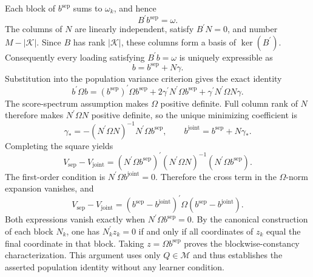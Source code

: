 Each block of \(b^{\mathrm{sep}}\) sums to \(\omega_k\), and hence
\[
B^{\prime}b^{\mathrm{sep}}=\omega.
\]
The columns of \(N\) are linearly independent, satisfy \(B^{\prime}N=0\), and number \(M-|\mathcal K|\). Since \(B\) has rank \(|\mathcal K|\), these columns form a basis of \(\ker(B^{\prime})\). Consequently every loading satisfying \(B^{\prime}b=\omega\) is uniquely expressible as
\[
b=b^{\mathrm{sep}}+N\gamma.
\]
Substitution into the population variance criterion gives the exact identity
\[
b^{\prime}\Omega b
=(b^{\mathrm{sep}})^{\prime}\Omega b^{\mathrm{sep}}
+2\gamma^{\prime}N^{\prime}\Omega b^{\mathrm{sep}}
+\gamma^{\prime}N^{\prime}\Omega N\gamma.
\]
The score-spectrum assumption makes \(\Omega\) positive definite. Full column rank of \(N\) therefore makes \(N^{\prime}\Omega N\) positive definite, so the unique minimizing coefficient is
\[
\gamma_*=-(N^{\prime}\Omega N)^{-1}N^{\prime}\Omega b^{\mathrm{sep}},
\qquad
b^{\mathrm{joint}}=b^{\mathrm{sep}}+N\gamma_*.
\]
Completing the square yields
\[
V_{\mathrm{sep}}-V_{\mathrm{joint}}
=(N^{\prime}\Omega b^{\mathrm{sep}})^{\prime}
(N^{\prime}\Omega N)^{-1}
(N^{\prime}\Omega b^{\mathrm{sep}}).
\]
The first-order condition is \(N^{\prime}\Omega b^{\mathrm{joint}}=0\). Therefore the cross term in the \(\Omega\)-norm expansion vanishes, and
\[
V_{\mathrm{sep}}-V_{\mathrm{joint}}
=(b^{\mathrm{sep}}-b^{\mathrm{joint}})^{\prime}
\Omega(b^{\mathrm{sep}}-b^{\mathrm{joint}}).
\]
Both expressions vanish exactly when \(N^{\prime}\Omega b^{\mathrm{sep}}=0\). By the canonical construction of each block \(N_k\), one has \(N_k^{\prime}z_k=0\) if and only if all coordinates of \(z_k\) equal the final coordinate in that block. Taking \(z=\Omega b^{\mathrm{sep}}\) proves the blockwise-constancy characterization. This argument uses only \(Q\in\mathcal M\) and thus establishes the asserted population identity without any learner condition.


